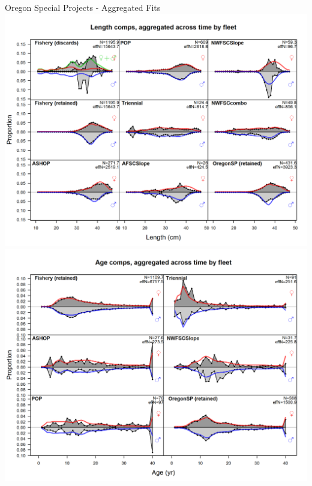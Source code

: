 \documentclass[pdf]{beamer}\usepackage[]{graphicx}\usepackage[]{color}
\begin{document}
\begin{frame}{Oregon Special Projects - Aggregated Fits}
  \includegraphics[scale = 0.37]{figures/ORspecial_agg_fit_length.png}
  \includegraphics[scale = 0.37]{figures/ORspecial_agg_fit_age.png}
\end{frame}
\end{document}
